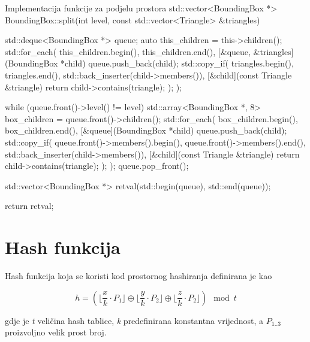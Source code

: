 \begin{cppSource}{Implementacija funkcije za podjelu prostora}
std::vector<BoundingBox *>
BoundingBox::split(int level, const std::vector<Triangle> &triangles) {
    std::deque<BoundingBox *> queue;
    auto this_children = this->children();
    std::for_each(
        this_children.begin(),
        this_children.end(),
        [&queue, &triangles](BoundingBox *child) {
            queue.push_back(child);
            std::copy_if(
                triangles.begin(),
                triangles.end(),
                std::back_inserter(child->members()),
                [&child](const Triangle &triangle) {
                    return child->contains(triangle);
                }
            );
        }
    );

    while (queue.front()->level() != level) {
        std::array<BoundingBox *, 8> box_children = queue.front()->children();
        std::for_each(
            box_children.begin(),
            box_children.end(),
            [&queue](BoundingBox *child) {
                queue.push_back(child);
                std::copy_if(
                    queue.front()->members().begin(),
                    queue.front()->members().end(),
                    std::back_inserter(child->members()),
                    [&child](const Triangle &triangle) {
                        return child->contains(triangle);
                    }
                );
            }
        );
        queue.pop_front();
    }

    std::vector<BoundingBox *> retval(std::begin(queue), std::end(queue));

    return retval;
}
\end{cppSource}

\pagebreak
\section{Hash funkcija}

Hash funkcija koja se koristi kod prostornog hashiranja definirana je kao

\begin{equation}
    h = (\lfloor \frac{x}{k} \cdot P_1 \rfloor \oplus \lfloor \frac{y}{k} \cdot P_2 \rfloor \oplus \lfloor \frac{z}{k} \cdot P_2 \rfloor) \mod t
\end{equation}

gdje je \textit{t} veličina hash tablice, \textit{k} predefinirana
konstantna vrijednost, a $ P_{1..3} $ proizvoljno velik prost broj. ~\cite{spatialhashing}

